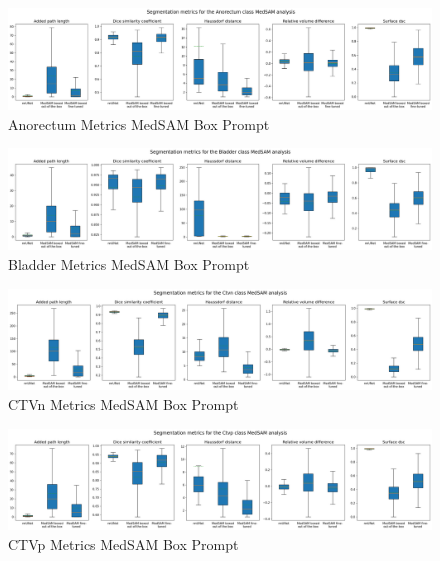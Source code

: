 \documentclass[11pt,twoside]{report}
\begin{document}
\begin{landscape}

  \begin{figure}[H]
    \centering
    \includegraphics[width=\linewidth]{../../research/source/code/data/metrics/metricsanorectum_1_combinednotable_MedSAM_analysis.png}
    \caption{Anorectum Metrics MedSAM Box Prompt}\label{fig:medsam-metrics-anorectum}
  \end{figure}

  \begin{figure}[H]
    \centering
    \includegraphics[width=\linewidth]{../../research/source/code/data/metrics/metricsbladder_1_combinednotable_MedSAM_analysis.png}
    \caption{Bladder Metrics MedSAM Box Prompt}\label{fig:medsam-metrics-bladder}
  \end{figure}

  \begin{figure}[H]
    \centering
    \includegraphics[width=\linewidth]{../../research/source/code/data/metrics/metricsctvn_1_combinednotable_MedSAM_analysis.png}
    \caption{CTVn Metrics MedSAM Box Prompt}\label{fig:medsam-metrics-ctvn}
  \end{figure}

  \begin{figure}[H]
    \centering
    \includegraphics[width=\linewidth]{../../research/source/code/data/metrics/metricsctvp_1_combinednotable_MedSAM_analysis.png}
    \caption{CTVp Metrics MedSAM Box Prompt}\label{fig:medsam-metrics-ctvp}
  \end{figure}


\end{landscape}
\end{document}
